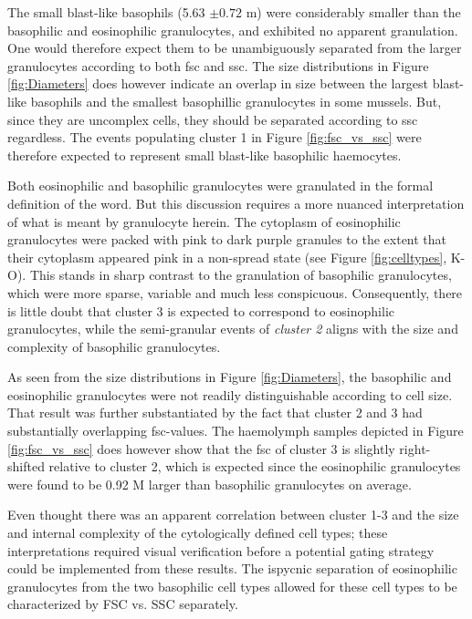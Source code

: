 The small blast-like basophils (5.63 $\pm{0.72}$ \micro m) were considerably smaller than the basophilic and eosinophilic granulocytes, and exhibited no apparent granulation. One would therefore expect them to be unambiguously separated from the larger granulocytes according to both \acrshort{fsc} and \acrshort{ssc}. The size distributions in Figure \ref{fig:Diameters} does however indicate an overlap in size between the largest blast-like basophils and the smallest basophillic granulocytes in some mussels. But, since they are uncomplex cells, they should be separated according to \acrshort{ssc} regardless. The events populating cluster 1 in Figure \ref{fig:fsc_vs_ssc} were therefore expected to represent small blast-like basophilic haemocytes. 

Both eosinophilic and basophilic granulocytes were granulated in the formal definition of the word. But this discussion requires a more nuanced interpretation of what is meant by granulocyte herein. The cytoplasm of eosinophilic granulocytes were packed with pink to dark purple granules to the extent that their cytoplasm appeared pink in a non-spread state (see Figure \ref{fig:celltypes}, K-O). This stands in sharp contrast to the granulation of basophilic granulocytes, which were more sparse, variable and much less conspicuous. Consequently, there is little doubt that cluster 3 is expected to correspond to eosinophilic granulocytes, while the semi-granular events of \emph{\emph{cluster 2}} aligns with the size and complexity of basophilic granulocytes.

As seen from the size distributions in Figure \ref{fig:Diameters}, the basophilic and eosinophilic granulocytes were not readily distinguishable according to cell size. That result was further substantiated by the fact that cluster 2 and 3 had substantially overlapping \acrshort{fsc}-values. The haemolymph samples depicted in Figure \ref{fig:fsc_vs_ssc} does however show that the \acrshort{fsc} of cluster 3 is slightly right-shifted relative to cluster 2, which is expected since the eosinophilic granulocytes were found to be 0.92 \micro M larger than basophilic granulocytes on average.

Even thought there was an apparent correlation between cluster 1-3 and the size and internal complexity of the cytologically defined cell types; these interpretations required visual verification before a potential gating strategy could be implemented from these results. The ispycnic separation of eosinophilic granulocytes from the two basophilic cell types allowed for these cell types to be characterized by FSC vs. SSC separately.

